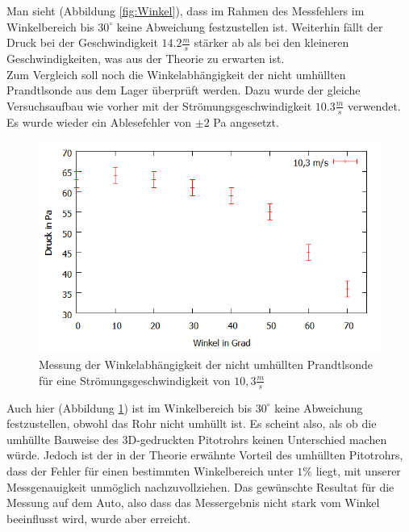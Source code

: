 Man sieht (Abbildung \ref{fig:Winkel}), dass im Rahmen des Messfehlers im Winkelbereich bis $30^\circ$ keine Abweichung festzustellen ist. Weiterhin fällt der Druck bei der Geschwindigkeit $14.2 \frac{m}{s}$ stärker ab als bei den kleineren Geschwindigkeiten, was aus der Theorie zu erwarten ist.
\\
Zum Vergleich soll noch die Winkelabhängigkeit der nicht umhüllten Prandtlsonde aus dem Lager überprüft werden. Dazu wurde der gleiche Versuchsaufbau wie vorher mit der Strömungsgeschwindigkeit $10.3 \frac{m}{s}$ verwendet. Es wurde wieder ein Ablesefehler von $\pm 2$ Pa angesetzt.
\begin{figure}
      \includegraphics[width=.9\textwidth]{images/Winkelnormalrohr}
\caption{Messung der Winkelabhängigkeit der nicht umhüllten Prandtlsonde für eine Strömungsgeschwindigkeit von $10,3 \frac{m}{s}$}
\label{fig:Winkelnormalrohr}
\end{figure}
Auch hier (Abbildung \ref{fig:Winkelnormalrohr}) ist im Winkelbereich bis $30^\circ$ keine Abweichung festzustellen, obwohl das Rohr nicht umhüllt ist.
Es scheint also, als ob die umhüllte Bauweise des 3D-gedruckten Pitotrohrs keinen Unterschied machen würde. Jedoch ist der in der Theorie erwähnte Vorteil des umhüllten Pitotrohrs, dass der Fehler für einen bestimmten Winkelbereich unter $1\%$ liegt, mit unserer Messgenauigkeit unmöglich nachzuvollziehen. Das gewünschte Resultat für die Messung auf dem Auto, also dass das Messergebnis nicht stark vom Winkel beeinflusst wird, wurde aber erreicht.
